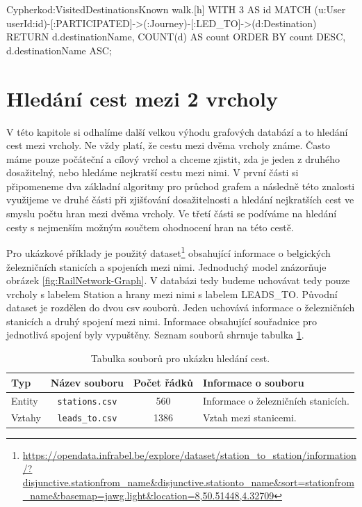 \documentclass[
  program=infoi,
  biblatex=true,
  sourcecodes=true,
  figures=true,
  glossaries=false,
  index
]{kidiplom}
\begin{document}
\begin{kicode}{Cypher}{kod:VisitedDestinations}{Known walk.}[h]
WITH 3 AS id
MATCH (u:User {userId:id})-[:PARTICIPATED]->(:Journey)-[:LED_TO]->(d:Destination)
RETURN d.destinationName, COUNT(d) AS count
ORDER BY count DESC, d.destinationName ASC;
\end{kicode}

\section{Hledání cest mezi 2 vrcholy}
V této kapitole si odhalíme další velkou výhodu grafových databází a to hledání cest mezi vrcholy. Ne vždy platí, že cestu mezi dvěma vrcholy známe. Často máme pouze počáteční a cílový vrchol a chceme zjistit, zda je jeden z druhého dosažitelný, nebo hledáme nejkratší cestu mezi nimi. V první části si připomeneme dva základní algoritmy pro průchod grafem a následně této znalosti využijeme ve druhé části při zjišťování dosažitelnosti a hledání nejkratších cest ve smyslu počtu hran mezi dvěma vrcholy. Ve třetí části se podíváme na hledání cesty s nejmenším možným součtem ohodnocení hran na této cestě.

Pro ukázkové příklady je použitý dataset\footnote{\url{https://opendata.infrabel.be/explore/dataset/station_to_station/information/?disjunctive.stationfrom_name&disjunctive.stationto_name&sort=stationfrom_name&basemap=jawg.light&location=8,50.51448,4.32709}} obsahující informace o belgických železničních stanicích a spojeních mezi nimi. Jednoduchý model znázorňuje obrázek \ref{fig:RailNetwork-Graph}. V databázi tedy budeme uchovávat tedy pouze vrcholy s labelem Station a hrany mezi nimi s labelem LEADS\_TO. Původní dataset je rozdělen do dvou csv souborů. Jeden uchovává informace o železničních stanicích a druhý spojení mezi nimi. Informace obsahující souřadnice pro jednotlivá spojení byly vypuštěny. Seznam souborů shrnuje tabulka \ref{tab:RailNetwork-csv}.

\begin{table}[h]
\caption{Tabulka souborů pro ukázku hledání cest.}
\label{tab:RailNetwork-csv}
\begin{tabularx}{\textwidth}{ | l | c | c | X | }
 \hline
 \textbf{Typ} & \textbf{Název souboru} & \textbf{Počet řádků} & \textbf{Informace o souboru} \\
 \hline \hline
 Entity & \texttt{stations.csv} & 560 & Informace o železničních stanicích. \\
 \hline
 Vztahy & \texttt{leads\_to.csv} & 1386 & Vztah mezi stanicemi.\\
 \hline
\end{tabularx}
\end{table}
\end{document}
